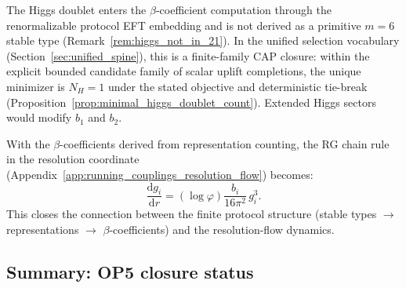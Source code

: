 \begin{remark}\label{rem:higgs_beta_interface}
\AuditTag The Higgs doublet enters the $\beta$-coefficient computation through the renormalizable protocol EFT embedding and is not derived as a primitive $m=6$ stable type (Remark~\ref{rem:higgs_not_in_21}).
\AuditTag In the unified selection vocabulary (Section~\ref{sec:unified_spine}), this is a finite-family CAP closure:
within the explicit bounded candidate family of scalar uplift completions, the unique minimizer is $N_H=1$ under the stated objective and deterministic tie-break (Proposition~\ref{prop:minimal_higgs_doublet_count}).
Extended Higgs sectors would modify $b_1$ and $b_2$.
\end{remark}

\begin{remark}\label{rem:beta_r_coordinate}
With the $\beta$-coefficients derived from representation counting, the RG chain rule in the resolution coordinate (Appendix~\ref{app:running_couplings_resolution_flow}) becomes:
\begin{equation}
\frac{\mathrm{d}g_i}{\mathrm{d}r} = (\log\varphi)\frac{b_i}{16\pi^2}\,g_i^3.
\end{equation}
This closes the connection between the finite protocol structure (stable types $\to$ representations $\to$ $\beta$-coefficients) and the resolution-flow dynamics.
\end{remark}

\subsection{Summary: OP5 closure status}
\label{subsec:op5_closure_summary}

